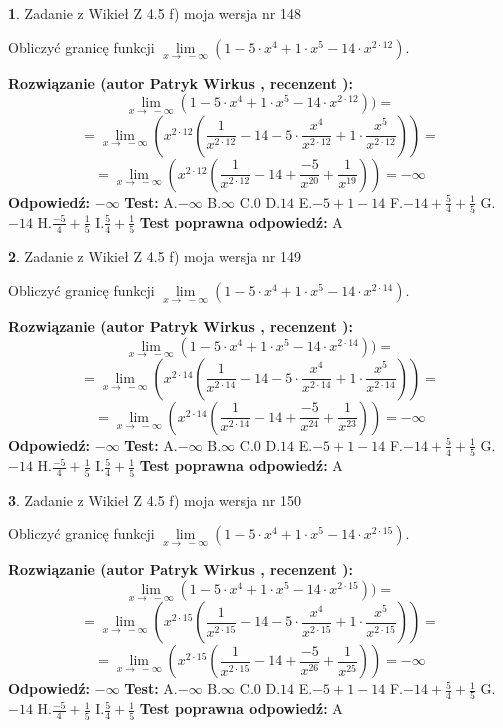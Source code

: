 \documentclass[12pt, a4paper]{article}
\theoremstyle{definition} %
\newtheorem{zad}{}
\newcommand{\zadStart}[1]{\begin{zad}#1\newline}
\newcommand{\zadStop}{\end{zad}}
\newcommand{\rozwStart}[2]{\noindent \textbf{Rozwiązanie (autor #1 , recenzent #2): }\newline}
\newcommand{\rozwStop}{\newline}
\newcommand{\odpStart}{\noindent \textbf{Odpowiedź:}\newline}
\newcommand{\odpStop}{\newline}
\newcommand{\testStart}{\noindent \textbf{Test:}\newline}
\newcommand{\testStop}{\newline}
\newcommand{\kluczStart}{\noindent \textbf{Test poprawna odpowiedź:}\newline}
\newcommand{\kluczStop}{\newline}
\begin{document}
\zadStart{Zadanie z Wikieł Z 4.5 f) moja wersja nr 148}



Obliczyć granicę funkcji  $\lim\limits_{x\to\ -\infty}(1 - 5 \cdot x^{4}+1 \cdot x^{5}- 14 \cdot x^{2\cdot12})$.
\zadStop
\rozwStart{Patryk Wirkus}{}
$$\lim\limits_{x\to\ -\infty}(1 - 5 \cdot x^{4}+1 \cdot x^{5}- 14 \cdot x^{2\cdot12}))=$$
$$=\lim\limits_{x\to\ -\infty}(x^{2\cdot12}(\frac{1}{x^{2\cdot12}}-14 -5 \cdot \frac{x^{4}}{x^{2\cdot12}}+1 \cdot \frac{x^{5}}{x^{2\cdot12}}))=$$
$$=\lim\limits_{x\to\ -\infty}(x^{2\cdot12}(\frac{1}{x^{2\cdot12}}-14 + \frac{-5}{x^{20}}+ \frac{1}{x^{19}}))=-\infty$$
\rozwStop
\odpStart
$-\infty$
\odpStop
\testStart
A.$-\infty$ B.$\infty$ C.$0$ D.$14$ E.$-5 + 1 - 14$
F.$-14+\frac{5}{4}+\frac{1}{5}$ G.$-14$
H.$\frac{-5}{4}+\frac{1}{5}$
I.$\frac{5}{4}+\frac{1}{5}$
\testStop
\kluczStart
A
\kluczStop



\zadStart{Zadanie z Wikieł Z 4.5 f) moja wersja nr 149}



Obliczyć granicę funkcji  $\lim\limits_{x\to\ -\infty}(1 - 5 \cdot x^{4}+1 \cdot x^{5}- 14 \cdot x^{2\cdot14})$.
\zadStop
\rozwStart{Patryk Wirkus}{}
$$\lim\limits_{x\to\ -\infty}(1 - 5 \cdot x^{4}+1 \cdot x^{5}- 14 \cdot x^{2\cdot14}))=$$
$$=\lim\limits_{x\to\ -\infty}(x^{2\cdot14}(\frac{1}{x^{2\cdot14}}-14 -5 \cdot \frac{x^{4}}{x^{2\cdot14}}+1 \cdot \frac{x^{5}}{x^{2\cdot14}}))=$$
$$=\lim\limits_{x\to\ -\infty}(x^{2\cdot14}(\frac{1}{x^{2\cdot14}}-14 + \frac{-5}{x^{24}}+ \frac{1}{x^{23}}))=-\infty$$
\rozwStop
\odpStart
$-\infty$
\odpStop
\testStart
A.$-\infty$ B.$\infty$ C.$0$ D.$14$ E.$-5 + 1 - 14$
F.$-14+\frac{5}{4}+\frac{1}{5}$ G.$-14$
H.$\frac{-5}{4}+\frac{1}{5}$
I.$\frac{5}{4}+\frac{1}{5}$
\testStop
\kluczStart
A
\kluczStop



\zadStart{Zadanie z Wikieł Z 4.5 f) moja wersja nr 150}



Obliczyć granicę funkcji  $\lim\limits_{x\to\ -\infty}(1 - 5 \cdot x^{4}+1 \cdot x^{5}- 14 \cdot x^{2\cdot15})$.
\zadStop
\rozwStart{Patryk Wirkus}{}
$$\lim\limits_{x\to\ -\infty}(1 - 5 \cdot x^{4}+1 \cdot x^{5}- 14 \cdot x^{2\cdot15}))=$$
$$=\lim\limits_{x\to\ -\infty}(x^{2\cdot15}(\frac{1}{x^{2\cdot15}}-14 -5 \cdot \frac{x^{4}}{x^{2\cdot15}}+1 \cdot \frac{x^{5}}{x^{2\cdot15}}))=$$
$$=\lim\limits_{x\to\ -\infty}(x^{2\cdot15}(\frac{1}{x^{2\cdot15}}-14 + \frac{-5}{x^{26}}+ \frac{1}{x^{25}}))=-\infty$$
\rozwStop
\odpStart
$-\infty$
\odpStop
\testStart
A.$-\infty$ B.$\infty$ C.$0$ D.$14$ E.$-5 + 1 - 14$
F.$-14+\frac{5}{4}+\frac{1}{5}$ G.$-14$
H.$\frac{-5}{4}+\frac{1}{5}$
I.$\frac{5}{4}+\frac{1}{5}$
\testStop
\kluczStart
A
\kluczStop
\end{document}
